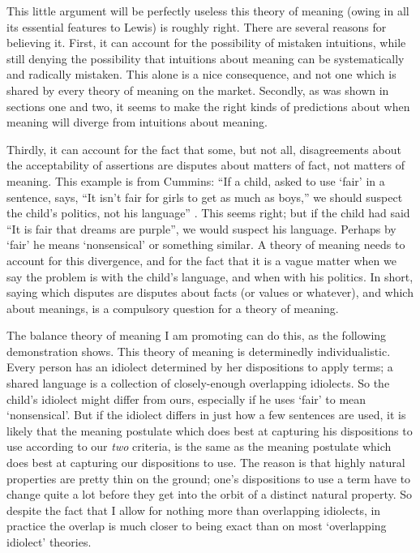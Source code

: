 This little argument will be perfectly useless this theory of meaning (owing in all its essential features to Lewis) is roughly right. There are several reasons for believing it. First, it can account for the possibility of mistaken intuitions, while still denying the possibility that intuitions about meaning can be systematically and radically mistaken. This alone is a nice consequence, and not one which is shared by every theory of meaning on the market. Secondly, as was shown in sections one and two, it seems to make the right kinds of predictions about when meaning will diverge from intuitions about meaning.

Thirdly, it can account for the fact that some, but not all, disagreements about the acceptability of assertions are disputes about matters of fact, not matters of meaning. This example is from Cummins:\textbf{ }``If a child, asked to use `fair' in a sentence, says, ``It isn't fair for girls to get as much as boys,'' we should suspect the child's politics, not his language'' \citeyear[120]{Cummins1998}. This seems right; but if the child had said ``It is fair that dreams are purple'', we would suspect his language. Perhaps by `fair' he means `nonsensical' or something similar. A theory of meaning needs to account for this divergence, and for the fact that it is a vague matter when we say the problem is with the child's language, and when with his politics. In short, saying which disputes are disputes about facts (or values or whatever), and which about meanings, is a compulsory question for a theory of meaning. 

The balance theory of meaning I am promoting can do this, as the following demonstration shows. This theory of meaning is determinedly individualistic. Every person has an idiolect determined by her dispositions to apply terms; a shared language is a collection of closely-enough overlapping idiolects. So the child's idiolect might differ from ours, especially if he uses `fair' to mean `nonsensical'. But if the idiolect differs in just how a few sentences are used, it is likely that the meaning postulate which does best at capturing his dispositions to use according to our \textit{two }criteria, is the same as the meaning postulate which does best at capturing our dispositions to use. The reason is that highly natural properties are pretty thin on the ground; one's dispositions to use a term have to change quite a lot before they get into the orbit of a distinct natural property. So despite the fact that I allow for nothing more than overlapping idiolects, in practice the overlap is much closer to being exact than on most `overlapping idiolect' theories.

